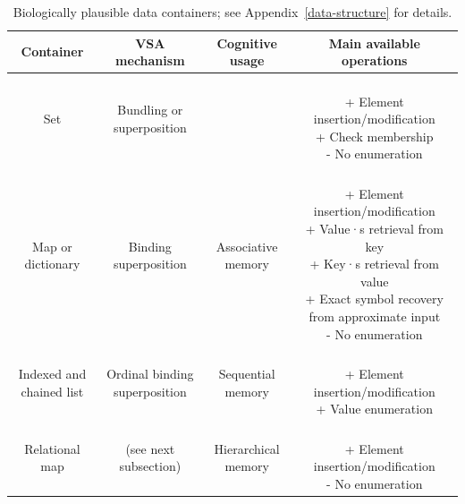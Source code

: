 \documentclass[sn-mathphys]{sn-jnl}
\begin{document}
\begin{table}[htbp]
  \begin{center}\begin{tabular}{|c|c|c|c|}
      \hline
     \parbox[u]{0.2\textwidth}{Container} & \parbox[u]{0.2\textwidth}{VSA mechanism} & \parbox[u]{0.2\textwidth}{Cognitive usage} & \parbox[u]{0.3\textwidth}{Main available operations} \\
\hline
     \parbox[u]{0.2\textwidth}{Set} & \parbox[u]{0.2\textwidth}{Bundling or superposition} & & \parbox[u]{0.3\textwidth}{~\\+ Element insertion/modification \\ + Check membership \\ - No enumeration\\} \\
\hline     
     \parbox[u]{0.2\textwidth}{Map or dictionary} & \parbox[u]{0.2\textwidth}{Binding superposition} & \parbox[u]{0.2\textwidth}{Associative memory} & \parbox[u]{0.3\textwidth}{~\\+ Element insertion/modification \\ + Value·s retrieval from key\\ + Key·s retrieval from value \\ + Exact symbol recovery from approximate input \\ - No enumeration\\} \\
\hline     
     \parbox[u]{0.2\textwidth}{Indexed and chained list} & \parbox[u]{0.2\textwidth}{Ordinal binding superposition} & \parbox[u]{0.2\textwidth}{Sequential memory} & \parbox[u]{0.3\textwidth}{~\\+ Element insertion/modification \\ + Value enumeration\\} \\
\hline     
     \parbox[u]{0.2\textwidth}{Relational map} & \parbox[u]{0.2\textwidth}{(see next subsection)} & \parbox[u]{0.2\textwidth}{Hierarchical memory} & \parbox[u]{0.3\textwidth}{~\\+ Element insertion/modification \\ - No enumeration\\} \\
\hline     
 \end{tabular} \end{center}~\\
\caption{Biologically plausible data containers; see Appendix~\ref{data-structure} for details.} \label{containers-table}
\end{table}
\end{document}
